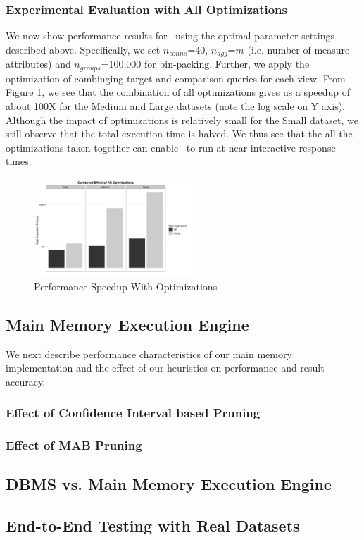 \subsubsection{Experimental Evaluation with All Optimizations}

We now show performance results for \SeeDB\ using the optimal parameter settings
described above. Specifically, we set $n_{conns}$=40, $n_{agg}$=$m$ (i.e.
number of measure attributes) and $n_{groups}$=100,000 for bin-packing. Further,
we apply the optimization of combinging target and comparison queries for each view. From
Figure \ref{fig:total_speed_up}, we see that the combination of all
optimizations gives us a speedup of about 100X for the Medium and Large
datasets (note the log scale on Y axis). Although the impact of optimizations is
relatively small for the Small dataset, we still observe that the total
execution time is halved. We thus see that the all the optimizations
taken together can enable \SeeDB\ to run at near-interactive response times.

\begin{figure}[h]
  \centering
    \includegraphics[width=6cm]{Images/total_speedup.pdf}
  \caption{Performance Speedup With Optimizations} 
  \label{fig:total_speed_up}
\end{figure}

\subsection{Main Memory Execution Engine}

We next describe performance characteristics of our main memory implementation
and the effect of our heuristics on performance and result accuracy.

\subsubsection{Effect of Confidence Interval based Pruning}

\subsubsection{Effect of MAB Pruning}

\subsection{DBMS vs. Main Memory Execution Engine}

\subsection{End-to-End Testing with Real Datasets}
